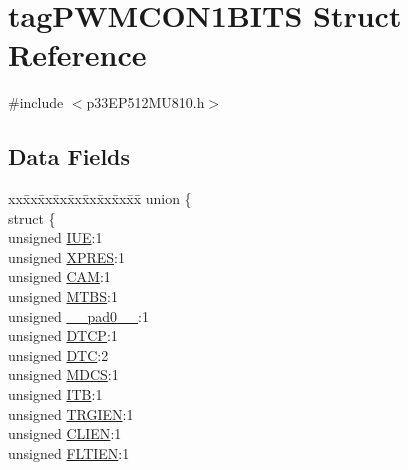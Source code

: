 \hypertarget{structtag_p_w_m_c_o_n1_b_i_t_s}{}\section{tag\+P\+W\+M\+C\+O\+N1\+B\+I\+TS Struct Reference}
\label{structtag_p_w_m_c_o_n1_b_i_t_s}


{\ttfamily \#include $<$p33\+E\+P512\+M\+U810.\+h$>$}

\subsection*{Data Fields}
\begin{DoxyCompactItemize}
\item 
\begin{tabbing}
xx\=xx\=xx\=xx\=xx\=xx\=xx\=xx\=xx\=\kill
union \{\\
\>struct \{\\
\>\>unsigned \hyperlink{structtag_p_w_m_c_o_n1_b_i_t_s_a2b95b61e8c208d0ffdc7441133d3b0a3}{IUE}:1\\
\>\>unsigned \hyperlink{structtag_p_w_m_c_o_n1_b_i_t_s_a6a3f824223966417e0005dbe08b1833c}{XPRES}:1\\
\>\>unsigned \hyperlink{structtag_p_w_m_c_o_n1_b_i_t_s_a912fd2c19cfc2bb7d43e4cb3bae4d0bf}{CAM}:1\\
\>\>unsigned \hyperlink{structtag_p_w_m_c_o_n1_b_i_t_s_ad4b1db357995f4e3ff43d2e6c734159e}{MTBS}:1\\
\>\>unsigned \hyperlink{structtag_p_w_m_c_o_n1_b_i_t_s_adf71f3d8410c1f1dbbc96680a92c49af}{\_\_pad0\_\_}:1\\
\>\>unsigned \hyperlink{structtag_p_w_m_c_o_n1_b_i_t_s_a42fd7808d2a3b328aac343a2c4e781d7}{DTCP}:1\\
\>\>unsigned \hyperlink{structtag_p_w_m_c_o_n1_b_i_t_s_a0ac766a24b648c50040810c3f207926c}{DTC}:2\\
\>\>unsigned \hyperlink{structtag_p_w_m_c_o_n1_b_i_t_s_acb5516c8c2c937478d0e653afdb05254}{MDCS}:1\\
\>\>unsigned \hyperlink{structtag_p_w_m_c_o_n1_b_i_t_s_a5d923b710199bb786b4c9f1d71b104f2}{ITB}:1\\
\>\>unsigned \hyperlink{structtag_p_w_m_c_o_n1_b_i_t_s_a4dd5600256667e48b1fe49e80ef95d33}{TRGIEN}:1\\
\>\>unsigned \hyperlink{structtag_p_w_m_c_o_n1_b_i_t_s_a6536fa9a3ad62ffb7a3ed0a2b1bf6394}{CLIEN}:1\\
\>\>unsigned \hyperlink{structtag_p_w_m_c_o_n1_b_i_t_s_a4d88b1c37d3feefa1055445ffc9a981c}{FLTIEN}:1\\

\end{tabbing}
\end{DoxyCompactItemize}
